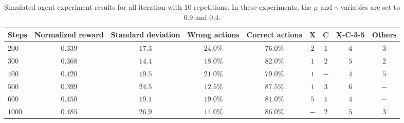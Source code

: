 \documentclass[11pt, a4paper]{article} %
\begin{document}
\begin{table*}[h]
\small\sf\centering 
\begin{tabular}{lcccccccc} 
\toprule
Steps & Normalized reward & Standard deviation & Wrong actions& Correct actions & X & C & X-C-3-5 & Others  \\
\midrule
$200$ & $0.339$ & $17.3$  &$24.0\%$  & $76.0\%$ & $2$  & $1$ & $4$ & $3$\\ 
$300$ & $0.368$ & $14.4$  &$18.0\%$  & $82.0\%$ & $1$  & $2$ & $5$ & $2$\\ 
$400$ & $0.420$ & $19.5$  &$21.0\%$  & $79.0\%$ & $1$  & $-$ & $4$ & $5$\\  
$500$ & $0.399$ & $24.5$  &$12.5\%$  & $87.5\%$ & $1$  & $3$ & $6$ & $-$\\ 
$600$ & $0.450$ & $19.1$  &$19.0\%$  & $81.0\%$ & $5$  & $1$ & $4$ & $-$\\ 
$1000$ & $0.485$ & $26.9$ &$14.0\%$  & $86.0\%$ & $-$  & $2$ & $5$ & $3$\\ \hline
\end{tabular} 
\caption{Simulated agent experiment results for all iteration with 10 repetitions. In these experiments, the $\mu$ and $\gamma$ variables are set to $0.9$ and $0.4$.}
\label{reward_cycle} 
\end{table*} 
\end{document}
